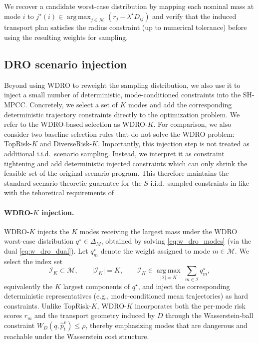\documentclass[letterpaper,10pt,conference]{ieeeconf}
\begin{document}
We recover a candidate worst-case distribution by mapping each nominal mass at mode $i$ to
$j^\star(i)\in\operatorname*{arg\,max}_{j\in\mathcal M}(r_j-\lambda^\star D_{ij})$ and verify that the induced transport plan satisfies the radius constraint (up to numerical tolerance) before using the resulting weights for sampling.

\subsection{DRO scenario injection}

Beyond using WDRO to reweight the sampling distribution, we also use it to inject a small number of deterministic, mode-conditioned constraints into the SH-MPCC. Concretely, we select a set of $K$ modes and add the corresponding deterministic trajectory constraints directly to the optimization problem. We refer to the WDRO-based selection as WDRO-$K$. For comparison, we also consider two baseline selection rules that do not solve the WDRO problem: TopRisk-$K$ and DiverseRisk-$K$. Importantly, this injection step is not treated as additional i.i.d.\ scenario sampling. Instead, we interpret it as constraint tightening and add deterministic injected constraints which can only shrink the feasible set of the original scenario program. This therefore maintains the standard scenario-theoretic guarantee for the $S$ i.i.d.\ sampled constraints in like with the tehoretical requirements of \cite{Cal2006ScenarioApproach}.

\paragraph{WDRO-$K$ injection.}
WDRO-$K$ injects the $K$ modes receiving the largest mass under the WDRO worst-case distribution
$q^\star \in \Delta_M$, obtained by solving \eqref{eq:w_dro_modes} (via the dual \eqref{eq:w_dro_dual}).
Let $q^\star_m$ denote the weight assigned to mode $m\in\mathcal{M}$.
We select the index set
\[
\mathcal{I}_K \subset \mathcal{M}, \qquad |\mathcal{I}_K|=K, \qquad 
\mathcal{I}_K \in \operatorname*{arg\,max}_{|\mathcal{I}|=K}\ \sum_{m\in\mathcal{I}} q^\star_m,
\]
equivalently the $K$ largest components of $q^\star$, and inject the corresponding deterministic
representatives (e.g., mode-conditioned mean trajectories) as hard constraints. Unlike TopRisk-$K$,
WDRO-$K$ incorporates both the per-mode risk scores $r_m$ and the transport geometry induced by $D$
through the Wasserstein-ball constraint $W_D(q,\widehat p_t^v)\le \rho$, thereby emphasizing modes
that are dangerous and reachable under the Wasserstein cost structure.
\end{document}

